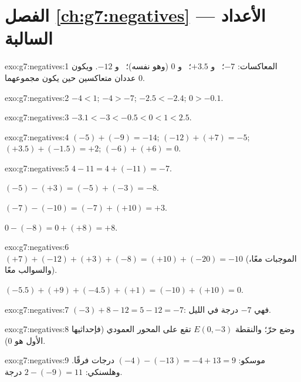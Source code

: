 \section*{الفصل \ref{ch:g7:negatives} --- الأعداد السالبة}

\begin{solution}{exo:g7:negatives:1}
المعاكسات: $-7$؛ \ و $+3.5$؛ \ و $0$ (وهو  نفسه)؛ \ و $-12$. ويكون
عددان متعاكسين حين يكون مجموعهما $0$.
\end{solution}

\begin{solution}{exo:g7:negatives:2}
$-4 < 1$; \quad $-4 > -7$; \quad $-2.5 < -2.4$; \quad $0 > -0.1$.
\end{solution}

\begin{solution}{exo:g7:negatives:3}
$-3.1 < -3 < -0.5 < 0 < 1 < 2.5$.
\end{solution}

\begin{solution}{exo:g7:negatives:4}
$(-5) + (-9) = -14$; \quad
$(-12) + (+7) = -5$; \quad
$(+3.5) + (-1.5) = +2$; \quad
$(-6) + (+6) = 0$.
\end{solution}

\begin{solution}{exo:g7:negatives:5}
$4 - 11 = 4 + (-11) = -7$.

$(-5) - (+3) = (-5) + (-3) = -8$.

$(-7) - (-10) = (-7) + (+10) = +3$.

$0 - (-8) = 0 + (+8) = +8$.
\end{solution}

\begin{solution}{exo:g7:negatives:6}
$(+7) + (-12) + (+3) + (-8) = (+10) + (-20) = -10$ (الموجبات
معًا، والسوالب معًا).

$(-5.5) + (+9) + (-4.5) + (+1) = (-10) + (+10) = 0$.
\end{solution}

\begin{solution}{exo:g7:negatives:7}
$(-3) + 8 - 12 = 5 - 12 = -7$: فهي $-7$ درجة في الليل.
\end{solution}

\begin{solution}{exo:g7:negatives:8}
وضع حرّ؛ والنقطة $E(0, -3)$ تقع على المحور العمودي (فإحداثيها الأول
هو $0$).
\end{solution}

\begin{solution}{exo:g7:negatives:9}
موسكو: $(-4) - (-13) = -4 + 13 = 9$ درجات فرقًا.
وهلسنكي: $2 - (-9) = 11$ درجة.
\end{solution}

